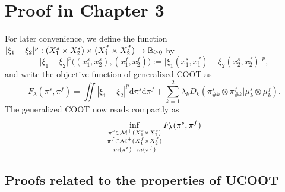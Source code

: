 \section{Proof in Chapter 3}

For later convenience, we define the function
$\vert \xi_1 - \xi_2 \vert^p: (X_1^s \times X_2^s) \times (X_1^f \times X_2^f) \to \mathbb R_{\geq 0}$ by
\begin{equation}
    \vert \xi_1 - \xi_2 \vert^p \big((x_1^s, x_2^s), (x_1^f, x_2^f)\big) :=
    \vert \xi_1(x_1^s, x_1^f) - \xi_2(x_2^s, x_2^f) \vert^p,
\end{equation}
and write the objective function of generalized COOT as
\begin{equation}
    F_{\lambda}(\pi^s, \pi^f) = \iint |\xi_1 - \xi_2|^p \mathrm d\pi^s \mathrm d \pi^f
    + \sum_{k=1}^2\lambda_k D_k(\pi^s_{\#k} \otimes \pi^f_{\#k} \vert \mu^s_k \otimes \mu^f_k).
\end{equation}
The generalized COOT now reads compactly as
\begin{equation} \label{eq:ucoot_copy}
  \inf_{\substack{\pi^s \in \mathcal M^+(X_1^s \times X_2^s) \\
  \pi^f \in \mathcal M^+(X_1^f \times X_2^f) \\ m(\pi^s) = m(\pi^f)}} F_{\lambda}(\pi^s, \pi^f)
\end{equation}

\subsection{Proofs related to the properties of UCOOT}

